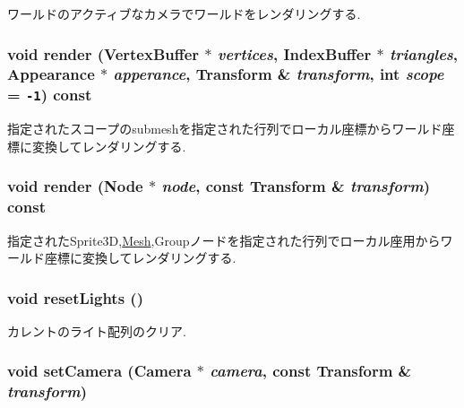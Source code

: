 ワールドのアクティブなカメラでワールドをレンダリングする. \hypertarget{classm3g_1_1Graphics3D_c809eea19f3eaff279628081fc90cf36}{
\subsubsection[{render}]{\setlength{\rightskip}{0pt plus 5cm}void render ({\bf VertexBuffer} $\ast$ {\em vertices}, \/  {\bf IndexBuffer} $\ast$ {\em triangles}, \/  {\bf Appearance} $\ast$ {\em apperance}, \/  {\bf Transform} \& {\em transform}, \/  int {\em scope} = {\tt -1}) const}}
\label{classm3g_1_1Graphics3D_c809eea19f3eaff279628081fc90cf36}


指定されたスコープのsubmeshを指定された行列でローカル座標からワールド座標に変換してレンダリングする. \hypertarget{classm3g_1_1Graphics3D_8f7b52c44e84e6ccbbb639d1b5b80466}{
\subsubsection[{render}]{\setlength{\rightskip}{0pt plus 5cm}void render ({\bf Node} $\ast$ {\em node}, \/  const {\bf Transform} \& {\em transform}) const}}
\label{classm3g_1_1Graphics3D_8f7b52c44e84e6ccbbb639d1b5b80466}


指定されたSprite3D,\hyperlink{classm3g_1_1Mesh}{Mesh},Groupノードを指定された行列でローカル座用からワールド座標に変換してレンダリングする. \hypertarget{classm3g_1_1Graphics3D_b8821ec231e8ebd939ae0feaaf138542}{
\subsubsection[{resetLights}]{\setlength{\rightskip}{0pt plus 5cm}void resetLights ()}}
\label{classm3g_1_1Graphics3D_b8821ec231e8ebd939ae0feaaf138542}


カレントのライト配列のクリア. \hypertarget{classm3g_1_1Graphics3D_0df7bb61cfeba6626e20fd07ddd1c460}{
\subsubsection[{setCamera}]{\setlength{\rightskip}{0pt plus 5cm}void setCamera ({\bf Camera} $\ast$ {\em camera}, \/  const {\bf Transform} \& {\em transform})}}
\label{classm3g_1_1Graphics3D_0df7bb61cfeba6626e20fd07ddd1c460}


